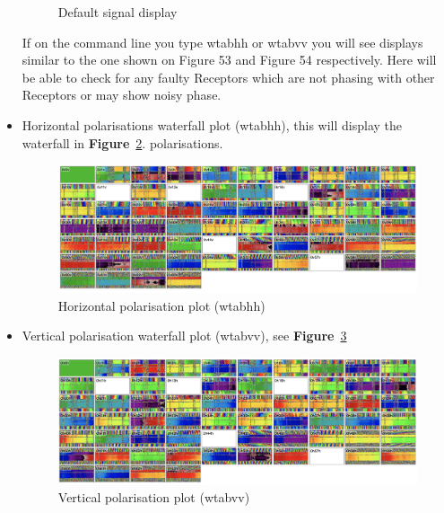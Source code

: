 \begin{itemize}
\begin{figure}[H]
	\caption{Default signal display}
	\label{fig:image50}
\end{figure}

If on the command line you type wtabhh  or wtabvv you will see displays similar to the one shown on Figure 53 and Figure 54 respectively. Here will be able to check for any faulty Receptors which are not phasing with other Receptors or may show noisy phase. 

\item{} Horizontal polarisations waterfall plot (wtabhh), this will display the waterfall in \textbf{Figure}~\ref{fig:image102}. polarisations. 
\clearpage

\begin{figure}[!thb]
	\centering
	\includegraphics[scale=0.23]{Chapters/images/image102.png}
	
	\caption{Horizontal polarisation plot (wtabhh)}
	\label{fig:image102}
\end{figure}

\item{} Vertical polarisation waterfall plot (wtabvv), see \textbf{Figure}~\ref{fig:image36}



\begin{figure}[!thb]
	\centering
	\includegraphics[scale=0.23]{Chapters/images/image36.png}
	
	\caption{Vertical polarisation plot (wtabvv)}
	\label{fig:image36}
\end{figure}


\end{itemize}
